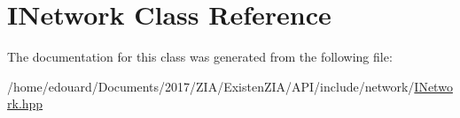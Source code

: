 \hypertarget{classINetwork}{}\section{I\+Network Class Reference}
\label{classINetwork}


The documentation for this class was generated from the following file\+:\begin{DoxyCompactItemize}
\item 
/home/edouard/\+Documents/2017/\+Z\+I\+A/\+Existen\+Z\+I\+A/\+A\+P\+I/include/network/\mbox{\hyperlink{INetwork_8hpp}{I\+Network.\+hpp}}\end{DoxyCompactItemize}
